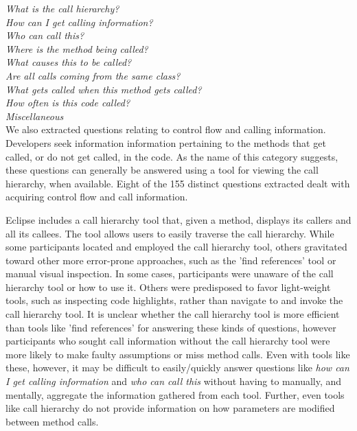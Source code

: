 \documentclass[conference]{IEEEtran}
\begin{document}
\noindent\emph{What is the call hierarchy?} \\
\emph{How can I get calling information?} \\
\emph{Who can call this?} \\
\emph{Where is the method being called?} \\
\emph{What causes this to be called?} \\
\emph{Are all calls coming from the same class?} \\
\emph{What gets called when this method gets called?} \\
\emph{How often is this code called?} \\
\emph{Miscellaneous} \\

We also extracted questions relating to control flow and calling information. 
Developers seek information information pertaining to the methods that get called, or do not get called, in the code. 
As the name of this category suggests, these questions can generally be answered using a tool for viewing the call hierarchy, when available. 
Eight of the 155 distinct questions extracted dealt with acquiring control flow and call information.

Eclipse includes a call hierarchy tool that, given a method, displays its callers and all its callees. 
The tool allows users to easily traverse the call hierarchy. 
While some participants located and employed the call hierarchy tool, others gravitated toward other more error-prone approaches, such as the 'find references' tool or manual visual inspection. 
In some cases, participants were unaware of the call hierarchy tool or how to use it. Others were predisposed to favor light-weight tools, such as inspecting code highlights, rather than navigate to and invoke the call hierarchy tool.
It is unclear whether the call hierarchy tool is more efficient than tools like 'find references' for answering these kinds of questions, however participants who sought call information without the call hierarchy tool were more likely to make faulty assumptions or miss method calls. 
Even with tools like these, however, it may be difficult to easily/quickly answer questions like \emph{how can I get calling information} and \emph{who can call this} without having to manually, and mentally, aggregate the information gathered from each tool. 
Further, even tools like call hierarchy do not provide information on how parameters are modified between method calls.
\end{document}
